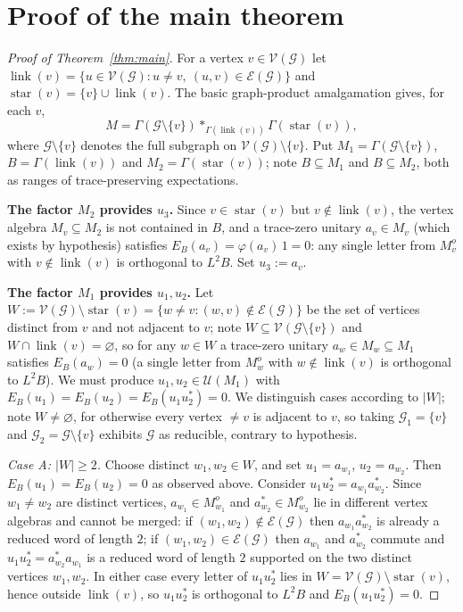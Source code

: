 \documentclass[a4paper, 11pt, reqno]{amsart}
\numberwithin{equation}{section}
\theoremstyle{plain}
\theoremstyle{remark}
\theoremstyle{definition}
\newcommand{\VV}{{\mathcal V}}
\newcommand{\EE}{{\mathcal E}}
\newcommand{\GG}{{\mathcal G}}
\begin{document}
\section{Proof of the main theorem}

\begin{proof}[Proof of Theorem~\ref{thm:main}]
For a vertex $v\in\VV(\GG)$ let $\operatorname{link}(v)=\{u\in\VV(\GG):u\neq v,\ (u,v)\in\EE(\GG)\}$ and $\operatorname{star}(v)=\{v\}\cup\operatorname{link}(v)$. The basic graph-product amalgamation \cite{Gr90,CaFi17} gives, for each $v$,
\begin{equation}\label{eq:star-decomp}
M=\Gamma(\GG\setminus\{v\})*_{\Gamma(\operatorname{link}(v))}\Gamma(\operatorname{star}(v)),
\end{equation}
where $\GG\setminus\{v\}$ denotes the full subgraph on $\VV(\GG)\setminus\{v\}$. Put $M_1=\Gamma(\GG\setminus\{v\})$, $B=\Gamma(\operatorname{link}(v))$ and $M_2=\Gamma(\operatorname{star}(v))$; note $B\subseteq M_1$ and $B\subseteq M_2$, both as ranges of trace-preserving expectations.

\medskip\noindent\textbf{The factor $M_2$ provides $u_3$.}
Since $v\in\operatorname{star}(v)$ but $v\notin\operatorname{link}(v)$, the vertex algebra $M_v\subseteq M_2$ is not contained in $B$, and a trace-zero unitary $a_v\in M_v$ (which exists by hypothesis) satisfies $E_B(a_v)=\varphi(a_v)\,1=0$: any single letter from $M_v^o$ with $v\notin\operatorname{link}(v)$ is orthogonal to $L^2B$. Set $u_3:=a_v$.

\medskip\noindent\textbf{The factor $M_1$ provides $u_1,u_2$.}
Let $W:=\VV(\GG)\setminus\operatorname{star}(v)=\{w\neq v:(w,v)\notin\EE(\GG)\}$ be the set of vertices distinct from $v$ and not adjacent to $v$; note $W\subseteq\VV(\GG\setminus\{v\})$ and $W\cap\operatorname{link}(v)=\varnothing$, so for any $w\in W$ a trace-zero unitary $a_w\in M_w\subseteq M_1$ satisfies $E_B(a_w)=0$ (a single letter from $M_w^o$ with $w\notin\operatorname{link}(v)$ is orthogonal to $L^2B$). We must produce $u_1,u_2\in\mathcal U(M_1)$ with $E_B(u_1)=E_B(u_2)=E_B(u_1u_2^*)=0$. We distinguish cases according to $|W|$; note $W\neq\varnothing$, for otherwise every vertex $\neq v$ is adjacent to $v$, so taking $\GG_1=\{v\}$ and $\GG_2=\GG\setminus\{v\}$ exhibits $\GG$ as reducible, contrary to hypothesis.

\emph{Case A: $|W|\ge2$.} Choose distinct $w_1,w_2\in W$, and set $u_1=a_{w_1}$, $u_2=a_{w_2}$. Then $E_B(u_1)=E_B(u_2)=0$ as observed above. Consider $u_1u_2^*=a_{w_1}a_{w_2}^*$. Since $w_1\neq w_2$ are distinct vertices, $a_{w_1}\in M_{w_1}^o$ and $a_{w_2}^*\in M_{w_2}^o$ lie in different vertex algebras and cannot be merged: if $(w_1,w_2)\notin\EE(\GG)$ then $a_{w_1}a_{w_2}^*$ is already a reduced word of length $2$; if $(w_1,w_2)\in\EE(\GG)$ then $a_{w_1}$ and $a_{w_2}^*$ commute and $u_1u_2^*=a_{w_2}^*a_{w_1}$ is a reduced word of length $2$ supported on the two distinct vertices $w_1,w_2$. In either case every letter of $u_1u_2^*$ lies in $W=\VV(\GG)\setminus\operatorname{star}(v)$, hence outside $\operatorname{link}(v)$, so $u_1u_2^*$ is orthogonal to $L^2B$ and $E_B(u_1u_2^*)=0$.


\end{proof}
\end{document}

